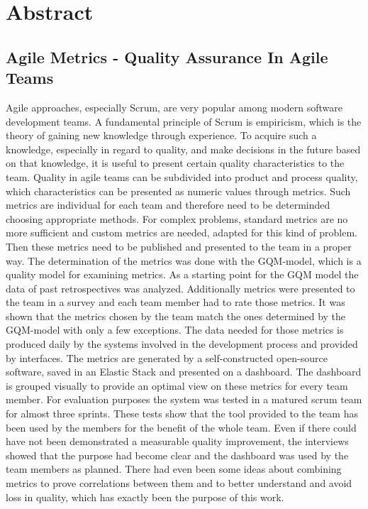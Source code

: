 \newpage
\chapter*{Abstract}
\section*{Agile Metrics {-} Quality Assurance In Agile Teams}

Agile approaches, especially Scrum, are very popular among modern software development teams.
A fundamental principle of Scrum is empiricism, which is the theory of gaining new knowledge through experience.
To acquire such a knowledge, especially in regard to quality, and make decisions in the future based on that knowledge, it is useful to present certain quality characteristics to the team.
Quality in agile teams can be subdivided into product and process quality, which characteristics can be presented as numeric values through metrics.
Such metrics are individual for each team and therefore need to be determinded choosing appropriate methods.
For complex problems, standard metrics are no more sufficient and custom metrics are needed, adapted for this kind of problem.
Then these metrics need to be published and presented to the team in a proper way.
The determination of the metrics was done with the \ac{GQM}-model, which is a quality model for examining metrics.
As a starting point for the GQM model the data of past retrospectives was analyzed.
Additionally metrics were presented to the team in a survey and each team member had to rate those metrics.
It was shown that the metrics chosen by the team match the ones determined by the \ac{GQM}-model with only a few exceptions.
The data needed for those metrics is produced daily by the systems involved in the development process and provided by interfaces.
The metrics are generated by a self-constructed open-source software, saved in an Elastic Stack and presented on a dashboard.
The dashboard is grouped visually to provide an optimal view on these metrics for every team member.
For evaluation purposes the system was tested in a matured scrum team for almost three sprints.
These tests show that the tool provided to the team has been used by the members for the benefit of the whole team.
Even if there could have not been demonstrated a measurable quality improvement, the interviews showed that the purpose had become clear and the dashboard was used by the team members as planned.
There had even been some ideas about combining metrics to prove correlations between them and to better understand and avoid loss in quality, which has exactly been the purpose of this work.
